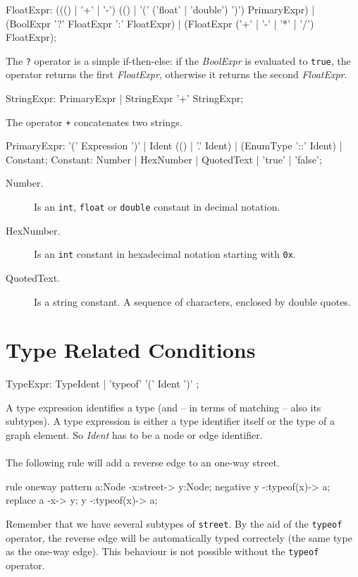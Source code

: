 \begin{rail}  
  FloatExpr: ((() | '+' | '-') (() | '(' ('float' | 'double') ')') PrimaryExpr) | (BoolExpr '?' FloatExpr ':' FloatExpr) | (FloatExpr ('+' | '-' | '*' | '/') FloatExpr);
\end{rail} 
The \texttt{?} operator is a simple if-then-else: if the \emph{BoolExpr} is evaluated to \texttt{true}, the operator returns the first \emph{FloatExpr}, otherwise it returns the second \emph{FloatExpr}.

\begin{rail}
  StringExpr: PrimaryExpr | StringExpr '+' StringExpr;
\end{rail}
The operator \texttt{+} concatenates two strings.

\begin{rail} 
  PrimaryExpr: '(' Expression ')' | Ident (() | '.' Ident) | (EnumType '::' Ident) | Constant;
  Constant: Number | HexNumber | QuotedText | 'true' | 'false';
\end{rail}
\begin{description}
  \item[Number.] Is an \texttt{int}, \texttt{float} or \texttt{double} constant in decimal notation.
  \item[HexNumber.] Is an \texttt{int} constant in hexadecimal notation starting with \texttt{0x}.
  \item[QuotedText.] Is a string constant. A sequence of characters, enclosed by double quotes.
\end{description} 

\section{Type Related Conditions}
\label{typeexpressions}

\begin{rail}
  TypeExpr: TypeIdent | 'typeof' '(' Ident ')' ;
\end{rail}
A type expression identifies a type (and -- in terms of matching -- also its subtypes). A type expression is either a type identifier itself or the type of a graph element. So \emph{Ident} has to be a node or edge identifier.\\
\\
{\small The following rule will add a reverse edge to an one-way street.}
\begin{grgen}
rule oneway {
    pattern{
        a:Node -x:street-> y:Node;
        negative{
            y -:typeof(x)-> a;
        }
    } 
    replace{
      a -x-> y;
      y -:typeof(x)-> a;
    }
}
\end{grgen}
{\small Remember that we have several subtypes of \texttt{street}. By the aid of the \texttt{typeof} operator, the reverse edge will be automatically typed correctely (the same type as the one-way edge). This behaviour is not possible without the \texttt{typeof} operator.\\}

